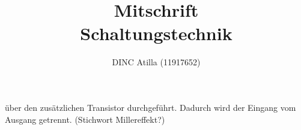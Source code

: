 \documentclass[a4paper]{article}
\title{Mitschrift\\Schaltungstechnik}
\author{DINC Atilla (11917652)}
\begin{document}
über den zusätzlichen Transistor durchgeführt. Dadurch wird der Eingang vom Ausgang getrennt. (Stichwort Millereffekt?)
\end{document}
